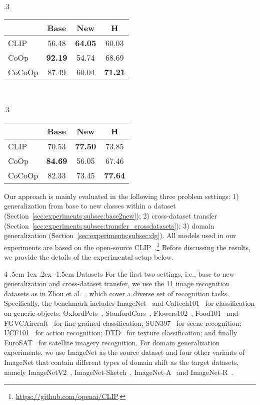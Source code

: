 \documentclass[10pt,twocolumn,letterpaper]{article}
\makeatletter
\renewcommand\paragraph{
  \@startsection{paragraph} {4} {\z@} {.5em \@plus1ex \@minus.2ex} {-1.5em} {\normalfont\normalsize\bfseries} }
\makeatother
\begin{document}
\begin{table*}[t]
\begin{subtable}[t]{.3\textwidth}
\begin{tabular}{l cc|c}
    \toprule
    & Base & New & H \\
    \midrule
    CLIP & 56.48 & \textbf{64.05} & 60.03 \\
    CoOp & \textbf{92.19} & 54.74 & 68.69 \\
    \rowcolor{tabhighlight}
    CoCoOp & 87.49 & 60.04 & \textbf{71.21} \\
    \bottomrule
    \end{tabular}
    \end{subtable}
    ~
    \begin{subtable}[t]{.3\textwidth}
    \centering
    \caption{UCF101.}
    \begin{tabular}{l cc|c}
    \toprule
    & Base & New & H \\
    \midrule
    CLIP & 70.53 & \textbf{77.50} & 73.85 \\
    CoOp & \textbf{84.69} & 56.05 & 67.46 \\
    \rowcolor{tabhighlight}
    CoCoOp & 82.33 & 73.45 & \textbf{77.64} \\
    \bottomrule
    \end{tabular}
    \end{subtable}
\end{table*}

Our approach is mainly evaluated in the following three problem settings: 1) generalization from base to new classes within a dataset (Section~\ref{sec:experiments;subsec:base2new}); 2) cross-dataset transfer (Section~\ref{sec:experiments;subsec:transfer_crossdatasets}); 3) domain generalization (Section~\ref{sec:experiments;subsec:dg}). All models used in our experiments are based on the open-source CLIP~\cite{radford2021learning}.\footnote{\url{https://github.com/openai/CLIP}.} Before discussing the results, we provide the details of the experimental setup below.

\paragraph{Datasets}
For the first two settings, i.e., base-to-new generalization and cross-dataset transfer, we use the 11 image recognition datasets as in Zhou et al.~\cite{zhou2021coop}, which cover a diverse set of recognition tasks. Specifically, the benchmark includes ImageNet~\cite{deng2009imagenet} and Caltech101~\cite{fei2004learning} for classification on generic objects; OxfordPets~\cite{parkhi2012cats}, StanfordCars~\cite{krause20133d}, Flowers102~\cite{nilsback2008automated}, Food101~\cite{bossard2014food} and FGVCAircraft~\cite{maji2013fine} for fine-grained classification; SUN397~\cite{xiao2010sun} for scene recognition; UCF101~\cite{soomro2012ucf101} for action recognition; DTD~\cite{cimpoi2014describing} for texture classification; and finally EuroSAT~\cite{helber2019eurosat} for satellite imagery recognition. For domain generalization experiments, we use ImageNet as the source dataset and four other variants of ImageNet that contain different types of domain shift as the target datasets, namely ImageNetV2~\cite{recht2019imagenet}, ImageNet-Sketch~\cite{wang2019learning}, ImageNet-A~\cite{hendrycks2021natural} and ImageNet-R~\cite{hendrycks2021many}.
\end{document}
